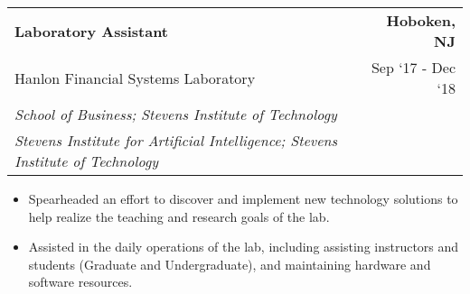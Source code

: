 \documentclass[10pt, letterpaper]{article}
\newcommand{\tabularxwidth}{\textwidth}
\begin{document}
    \begin{minipage}{\tabularxwidth}

        \begin{tabularx}{\tabularxwidth}{X r}
            \textbf{Laboratory Assistant} & \textbf{Hoboken, 
        NJ} \\
            Hanlon Financial Systems Laboratory & 
        
    Sep ‘17 - 
    Dec ‘18 \\
            
                
                    \textit{School of Business; Stevens Institute of Technology} & \\
                
                    \textit{Stevens Institute for Artificial Intelligence; Stevens Institute of Technology} & \\
                
            
            
        \end{tabularx}

        \begin{itemize}[noitemsep, topsep=3pt, parsep=0pt, partopsep=0pt]
            
                \item 
    Spearheaded an effort to discover and implement new technology solutions to help realize the teaching and research goals of the lab.
            
                \item 
    Assisted in the daily operations of the lab, including assisting instructors and students (Graduate and Undergraduate), and maintaining hardware and software resources.
            
        \end{itemize}

        
            \vspace{.5em}
        

    \end{minipage}
    
\end{document}
